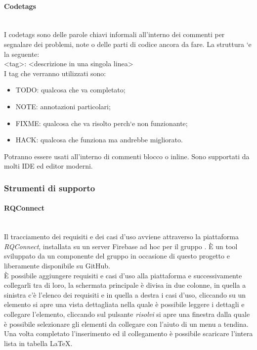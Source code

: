 \paragraph{Codetags}\mbox{}\\
I codetags sono delle parole chiavi informali all'interno dei commenti per segnalare
dei problemi, note o delle parti di codice ancora da fare. La struttura `e la seguente: \\
<tag>: <descrizione in una singola linea>\\
I tag che verranno utilizzati sono:\\
\begin{itemize}
\item TODO: qualcosa che va completato;
\item NOTE: annotazioni particolari;
\item FIXME: qualcosa che va risolto perch`e non funzionante;
\item HACK: qualcosa che funziona ma andrebbe migliorato.
\end{itemize}
Potranno essere usati all’interno di commenti blocco o inline. Sono supportati da
molti IDE ed editor moderni.



\subsubsection{Strumenti di supporto}
\paragraph{RQConnect}\mbox{}\\ \label{sec:Trac}
Il tracciamento dei requisiti e dei casi d’uso avviene attraverso la piattaforma 
\textit{RQConnect}, installata su un server {Firebase} ad hoc per il gruppo \gruppo.
 È  un tool sviluppato da un componente del gruppo in occasione di questo progetto e 
 liberamente disponibile su GitHub.\\ È possibile aggiungere requisiti e casi d’uso 
 alla piattaforma e successivamente collegarli tra di loro, la schermata principale è 
 divisa in due colonne, in quella a sinistra c’è l’elenco dei requisiti e in quella a 
 destra i casi d’uso, cliccando su un elemento si apre una vista dettagliata nella quale 
 è possibile leggere i dettagli e collegare l’elemento, cliccando sul pulsante \textit{risolvi} si 
 apre una finestra dalla quale è possibile selezionare gli elementi da collegare con l’aiuto 
 di un menu a tendina.\\Una volta completato l’inserimento ed il collegamento è possibile scaricare 
 l’intera lista in tabella \LaTeX.

